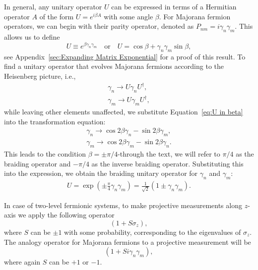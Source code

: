 \documentclass{article}
\begin{document}
In general, any unitary operator $ U $ can be expressed in terms of a Hermitian operator $ A $ of the form $ U = e^{i\beta A} $ with some angle $ \beta $. For Majorana fermion operators, we can begin with their parity operator, denoted as $ P_{nm} = i \gamma_n \gamma_m $. This allows us to define
\begin{equation}
	U \equiv e^{\beta \gamma_n \gamma_m} \quad \text{or} \quad U = \cos{\beta} + \gamma_n \gamma_m \sin{\beta},
	\label{eq:U in beta}
\end{equation}
see Appendix~\ref{sec:Expanding Matrix Exponential} for a proof of this result. To find a unitary operator that evolves Majorana fermions according to the Heisenberg picture, i.e.,
$$
	\begin{aligned}
		\gamma_n \rightarrow U \gamma_n U ^\dagger, \\
		\gamma_m \rightarrow U \gamma_m U ^\dagger,
	\end{aligned}
$$
while leaving other elements unaffected, we substitute Equation~\ref{eq:U in beta} into the transformation equation:
$$
	\begin{aligned}
		\gamma_n \rightarrow \cos{2 \beta} \gamma_n - \sin{2 \beta} \gamma_m, \\
		\gamma_m \rightarrow \cos{2 \beta} \gamma_m - \sin{2 \beta} \gamma_n.
		\label{eq:subst in transformation}
	\end{aligned}
$$
This leads to the condition $ \beta = \pm \pi / 4 $-through the text, we will refer to $ \pi /4 $ as the braiding operator and $ -\pi /4 $ as the inverse braiding operator. Substituting this into the expression, we obtain the braiding unitary operator for $ \gamma_n $ and $ \gamma_m $:
$$
	\begin{aligned}
		U = \exp \left( \pm \frac{\pi}{4} \gamma_n \gamma_m\right) = \frac{1}{\sqrt{2}}\left(1 \pm \gamma_n \gamma_m\right).
	\end{aligned}
$$

In case of two-level fermionic systems, to make projective measurements along $ z $-axis we apply the following operator
\begin{equation*}
	(1 + S \sigma_z),
\end{equation*}
where $ S $ can be $ \pm 1 $ with some probability, corresponding to the eigenvalues of $ \sigma_z $. The analogy operator for Majorana fermions to a projective measurement will be
\[
	(1 + S i \gamma_n \gamma_m),
\]
where again $ S $ can be $ +1 $ or $ -1 $.
\end{document}
